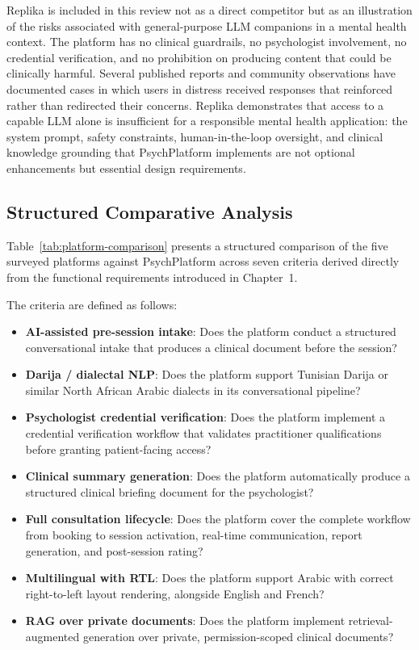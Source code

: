 \documentclass[a4paper,12pt]{report}
\begin{document}
Replika is included in this review not as a direct competitor but as an illustration
of the risks associated with general-purpose LLM companions in a mental health
context. The platform has no clinical guardrails, no psychologist involvement,
no credential verification, and no prohibition on producing content that could
be clinically harmful. Several published reports and community observations have
documented cases in which users in distress received responses that reinforced
rather than redirected their concerns. Replika demonstrates that access to a
capable LLM alone is insufficient for a responsible mental health application:
the system prompt, safety constraints, human-in-the-loop oversight, and clinical
knowledge grounding that PsychPlatform implements are not optional enhancements
but essential design requirements.
 
\subsection{Structured Comparative Analysis}
\label{subsec:comparison-table}
 
Table~\ref{tab:platform-comparison} presents a structured comparison of the five surveyed
platforms against PsychPlatform across seven criteria derived directly from the functional
requirements introduced in Chapter~1.
 
The criteria are defined as follows:
 
\begin{itemize}[leftmargin=1.5em, itemsep=4pt]
  \item[--] \textbf{AI-assisted pre-session intake}: Does the platform conduct a
    structured conversational intake that produces a clinical document before the
    session?
  \item[--] \textbf{Darija / dialectal NLP}: Does the platform support Tunisian
    Darija or similar North African Arabic dialects in its conversational pipeline?
  \item[--] \textbf{Psychologist credential verification}: Does the platform
    implement a credential verification workflow that validates practitioner
    qualifications before granting patient-facing access?
  \item[--] \textbf{Clinical summary generation}: Does the platform automatically
    produce a structured clinical briefing document for the psychologist?
  \item[--] \textbf{Full consultation lifecycle}: Does the platform cover the
    complete workflow from booking to session activation, real-time communication,
    report generation, and post-session rating?
  \item[--] \textbf{Multilingual with RTL}: Does the platform support Arabic with
    correct right-to-left layout rendering, alongside English and French?
  \item[--] \textbf{RAG over private documents}: Does the platform implement
    retrieval-augmented generation over private, permission-scoped clinical
    documents?
\end{itemize}
 
\end{document}
